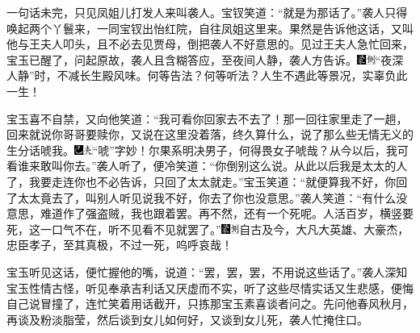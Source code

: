 一句话未完，只见凤姐儿打发人来叫袭人。宝钗笑道：“就是为那话了。”袭人只得唤起两个丫鬟来，一同宝钗出怡红院，自往凤姐这里来。果然是告诉他这话，又叫他与王夫人叩头，且不必去见贾母，倒把袭人不好意思的。见过王夫人急忙回来，宝玉已醒了，问起原故，袭人且含糊答应，至夜间人静，袭人方告诉。{\includegraphics[width=3mm]{../Images/00006}\includegraphics[width=3mm]{../Images/00011}\footnotesize \kaishu “夜深人静”时，不减长生殿风味。何等告法？何等听法？人生不遇此等景况，实辜负此一生！}

宝玉喜不自禁，又向他笑道：“我可看你回家去不去了！那一回往家里走了一趟，回来就说你哥哥要赎你，又说在这里没着落，终久算什么，说了那么些无情无义的生分话唬我。{\includegraphics[width=3mm]{../Images/00003}\includegraphics[width=3mm]{../Images/00012}\footnotesize \kaishu “唬”字妙！尔果系明决男子，何得畏女子唬哉？}从今以后，我可看谁来敢叫你去。”袭人听了，便冷笑道：“你倒别这么说。从此以后我是太太的人了，我要走连你也不必告诉，只回了太太就走。”宝玉笑道：“就便算我不好，你回了太太竟去了，叫别人听见说我不好，你去了你也没意思。”袭人笑道：“有什么没意思，难道作了强盗贼，我也跟着罢。再不然，还有一个死呢。人活百岁，横竖要死，这一口气不在，听不见看不见就罢了。”{\includegraphics[width=3mm]{../Images/00006}\includegraphics[width=3mm]{../Images/00011}\footnotesize \kaishu 自古及今，大凡大英雄、大豪杰，忠臣孝子，至其真极，不过一死，呜呼哀哉！}

宝玉听见这话，便忙握他的嘴，说道：“罢，罢，罢，不用说这些话了。”袭人深知宝玉性情古怪，听见奉承吉利话又厌虚而不实，听了这些尽情实话又生悲感，便悔自己说冒撞了，连忙笑着用话截开，只拣那宝玉素喜谈者问之。先问他春风秋月，再谈及粉淡脂莹，然后谈到女儿如何好，又谈到女儿死，袭人忙掩住口。

